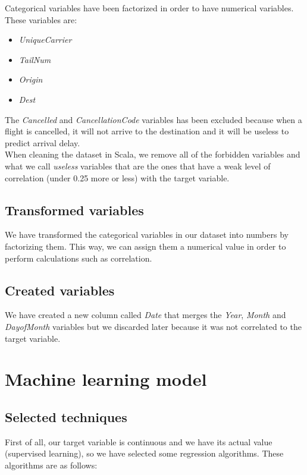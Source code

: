 Categorical variables have been factorized in order to have numerical variables. These variables are:

\begin{itemize}
	\item \textit{UniqueCarrier}
	\item \textit{TailNum}
	\item \textit{Origin}
	\item \textit{Dest}
\end{itemize}

The \textit{Cancelled} and \textit{CancellationCode} variables has been excluded because when a flight is cancelled, it will not arrive to the destination and it will be useless to predict arrival delay.\\

When cleaning the dataset in Scala, we remove all of the forbidden variables and what we call \textit{useless} variables that are the ones that have a weak level of correlation (under 0.25 more or less) with the target variable.

\subsection{Transformed variables}
We have transformed the categorical variables in our dataset into numbers by factorizing them. This way, we can assign them a numerical value in order to perform calculations such as correlation.

\subsection{Created variables}
We have created a new column called \textit{Date} that merges the \textit{Year}, \textit{Month} and \textit{DayofMonth} variables but we discarded later because it was not correlated to the target variable.

\section{Machine learning model}

\subsection{Selected techniques}

First of all, our target variable is continuous and we have its actual value (supervised learning), so we have selected some regression algorithms. These algorithms are as follows:


